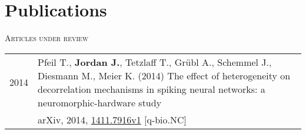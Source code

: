 \documentclass[a4paper,10pt]{article}
\begin{document}
\section{Publications}
\textsc{Articles under review}\\[.5em]
\begin{tabular}{>{\hfill}p{1.6cm} p{}}
  2014 & Pfeil T., \textbf{Jordan J.}, Tetzlaff T., Gr\"ubl A., Schemmel J., Diesmann M., Meier K. (2014) The effect of heterogeneity on decorrelation mechanisms in spiking neural networks: a neuromorphic-hardware study \\
  & \footnotesize arXiv, 2014, \href{http://arxiv.org/abs/1411.7916}{1411.7916v1} [q-bio.NC]
\end{tabular} \\[1em]

\newpage
\end{document}
